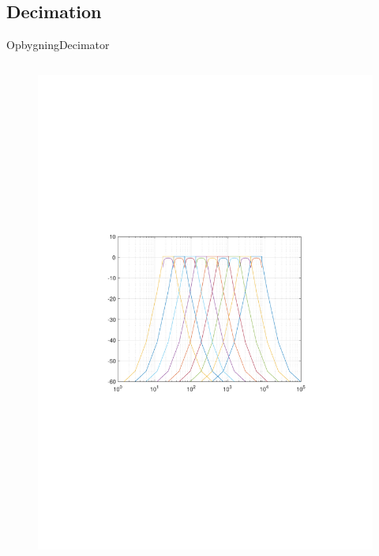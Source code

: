 \subsection{Decimation}
\begin{frame}{Opbygning}{Decimator}

\begin{columns}
  \begin{column}{0.4\textwidth}
\begin{figure}
\centering
\includegraphics[width=\textwidth]{Bands}
\end{figure}
  \end{column}


\end{columns}
\end{frame}
